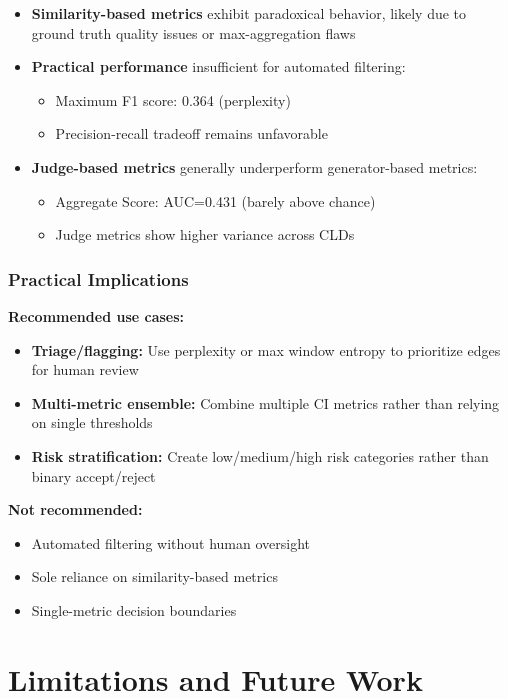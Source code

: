 \begin{itemize}
    \item \textbf{Similarity-based metrics} exhibit paradoxical behavior, likely due to ground truth quality issues or max-aggregation flaws
    \item \textbf{Practical performance} insufficient for automated filtering:
    \begin{itemize}
        \item Maximum F1 score: 0.364 (perplexity)
        \item Precision-recall tradeoff remains unfavorable
    \end{itemize}
    \item \textbf{Judge-based metrics} generally underperform generator-based metrics:
    \begin{itemize}
        \item Aggregate Score: AUC=0.431 (barely above chance)
        \item Judge metrics show higher variance across CLDs
    \end{itemize}
\end{itemize}

\subsubsection{Practical Implications}

\textbf{Recommended use cases:}
\begin{itemize}
    \item \textbf{Triage/flagging:} Use perplexity or max window entropy to prioritize edges for human review
    \item \textbf{Multi-metric ensemble:} Combine multiple CI metrics rather than relying on single thresholds
    \item \textbf{Risk stratification:} Create low/medium/high risk categories rather than binary accept/reject
\end{itemize}

\textbf{Not recommended:}
\begin{itemize}
    \item Automated filtering without human oversight
    \item Sole reliance on similarity-based metrics
    \item Single-metric decision boundaries
\end{itemize}

\section{Limitations and Future Work}

